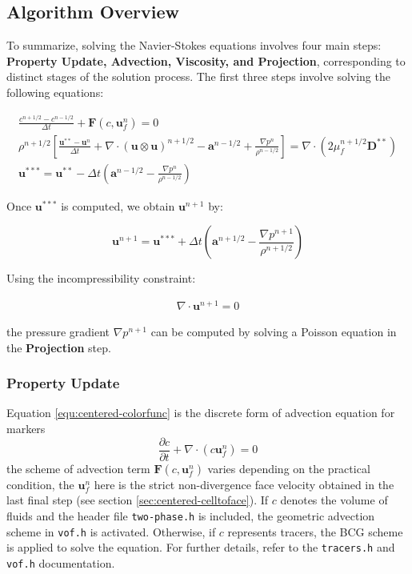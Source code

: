 \subsection{Algorithm Overview}
To summarize, solving the Navier-Stokes equations involves four main steps: \textbf{Property Update, Advection, Viscosity, and Projection}, corresponding to distinct stages of the solution process. The first three steps involve solving the following equations:

\begin{gather}
    \frac{c^{n+1/2} - c^{n-1/2}}{\Delta t} 
    + \mathbf{F}(c,\mathbf{u}_f^n) = 0 \label{equ:centered-colorfunc} \\
    \rho^{n+1/2} \left[ \frac{\mathbf{u}^{**} - \mathbf{u}^n}{\Delta t} 
    + \nabla \cdot (\mathbf{u} \otimes \mathbf{u})^{n+1/2} 
    - \mathbf{a}^{n-1/2} 
    + \frac{\nabla p^n}{\rho^{n-1/2}} \right] 
    = \nabla \cdot \left( 2\mu^{n+1/2}_f \mathbf{D}^{**} \right)\label{equ:centered-advdiff}\\
    \mathbf{u}^{***} = \mathbf{u}^{**} 
    - \Delta t \left( \mathbf{a}^{n-1/2} 
    - \frac{\nabla p^n}{\rho^{n-1/2}} \right)\label{equ:centered-diffalter}
\end{gather}

Once $\mathbf{u}^{***}$ is computed, we obtain $\mathbf{u}^{n+1}$ by:

\begin{equation}
    \mathbf{u}^{n+1} = \mathbf{u}^{***} 
    + \Delta t \left( \mathbf{a}^{n+1/2} 
    - \frac{\nabla p^{n+1}}{\rho^{n+1/2}} \right)
\end{equation}

Using the incompressibility constraint:

\begin{gather}
    \nabla \cdot \mathbf{u}^{n+1} = 0
\end{gather}

the pressure gradient $\nabla p^{n+1}$ can be computed by solving a Poisson equation in the \textbf{Projection} step.

\subsubsection{Property Update}
Equation \ref{equ:centered-colorfunc} is the discrete form of advection equation for markers
\begin{equation}
    \frac{\partial c}{\partial t} + \nabla\cdot(c\mathbf{u}_f^n) = 0
\end{equation}
the scheme of advection term $\mathbf{F}(c,\mathbf{u}_f^n)$ varies depending on the practical condition, the $\mathbf{u}_f^n$ here is the strict non-divergence face velocity obtained in the last final step (see section \ref{sec:centered-celltoface}). If $c$ denotes the volume of fluids and the header file \texttt{two-phase.h} is included, the geometric advection scheme in \texttt{vof.h} is activated. Otherwise, if $c$ represents tracers, the BCG scheme is applied to solve the equation. For further details, refer to the \texttt{tracers.h} and \texttt{vof.h} documentation.

